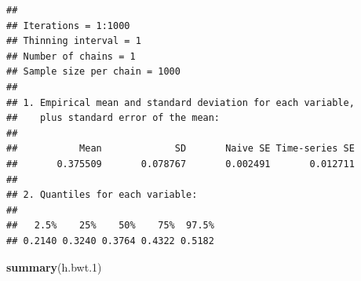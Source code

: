 \documentclass[
  12pt,
]{book}
\newenvironment{Shaded}{\begin{snugshade}}{\end{snugshade}}
\newcommand{\DataTypeTok}[1]{\textcolor[rgb]{0.13,0.29,0.53}{#1}}
\newcommand{\DecValTok}[1]{\textcolor[rgb]{0.00,0.00,0.81}{#1}}
\newcommand{\FloatTok}[1]{\textcolor[rgb]{0.00,0.00,0.81}{#1}}
\newcommand{\KeywordTok}[1]{\textcolor[rgb]{0.13,0.29,0.53}{\textbf{#1}}}
\newcommand{\NormalTok}[1]{#1}
\newcommand{\OperatorTok}[1]{\textcolor[rgb]{0.81,0.36,0.00}{\textbf{#1}}}
\newcommand{\OtherTok}[1]{\textcolor[rgb]{0.56,0.35,0.01}{#1}}
\newcommand{\StringTok}[1]{\textcolor[rgb]{0.31,0.60,0.02}{#1}}
\begin{document}
\begin{Shaded}
\end{Shaded}

\begin{verbatim}
## 
## Iterations = 1:1000
## Thinning interval = 1 
## Number of chains = 1 
## Sample size per chain = 1000 
## 
## 1. Empirical mean and standard deviation for each variable,
##    plus standard error of the mean:
## 
##           Mean             SD       Naive SE Time-series SE 
##       0.375509       0.078767       0.002491       0.012711 
## 
## 2. Quantiles for each variable:
## 
##   2.5%    25%    50%    75%  97.5% 
## 0.2140 0.3240 0.3764 0.4322 0.5182
\end{verbatim}

\begin{Shaded}
\begin{Highlighting}[]
\KeywordTok{summary}\NormalTok{(h.bwt}\FloatTok{.1}\NormalTok{)}
\end{Highlighting}
\end{Shaded}
\end{document}
